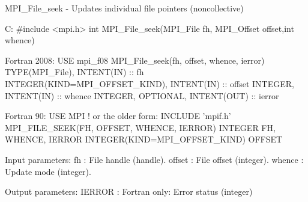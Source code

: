 MPI_File_seek - Updates individual file pointers (noncollective)

C:
#include <mpi.h>
int MPI_File_seek(MPI_File fh, MPI_Offset offset,int whence)

Fortran 2008:
USE mpi_f08
MPI_File_seek(fh, offset, whence, ierror)
    TYPE(MPI_File), INTENT(IN) :: fh
    INTEGER(KIND=MPI_OFFSET_KIND), INTENT(IN) :: offset
    INTEGER, INTENT(IN) :: whence
    INTEGER, OPTIONAL, INTENT(OUT) :: ierror

Fortran 90:
USE MPI
! or the older form: INCLUDE ’mpif.h’
MPI_FILE_SEEK(FH, OFFSET, WHENCE, IERROR)
    INTEGER    FH, WHENCE, IERROR
    INTEGER(KIND=MPI_OFFSET_KIND)    OFFSET

Input parameters:
fh     : File handle (handle). 
offset : File offset (integer). 
whence : Update mode (integer). 

Output parameters:
IERROR : Fortran only: Error status (integer)
